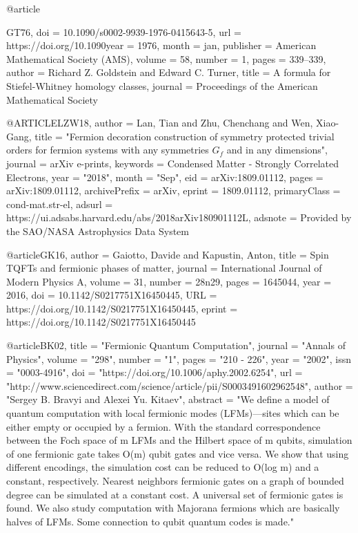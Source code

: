 \documentclass[12pt]{article}
\begin{document}
@article{GT76,
	doi = {10.1090/s0002-9939-1976-0415643-5},
	url = {https://doi.org/10.1090year = 1976,
	month = {jan},
	publisher = {American Mathematical Society ({AMS})},
	volume = {58},
	number = {1},
	pages = {339--339},
	author = {Richard Z. Goldstein and Edward C. Turner},
	title = {A formula for Stiefel-Whitney homology classes},
	journal = {Proceedings of the American Mathematical Society}
}

@ARTICLE{LZW18,
       author = {{Lan}, Tian and {Zhu}, Chenchang and {Wen}, Xiao-Gang},
        title = "{Fermion decoration construction of symmetry protected trivial orders for fermion systems with any symmetries $G_f$ and in any dimensions}",
      journal = {arXiv e-prints},
     keywords = {Condensed Matter - Strongly Correlated Electrons},
         year = "2018",
        month = "Sep",
          eid = {arXiv:1809.01112},
        pages = {arXiv:1809.01112},
archivePrefix = {arXiv},
       eprint = {1809.01112},
 primaryClass = {cond-mat.str-el},
       adsurl = {https://ui.adsabs.harvard.edu/abs/2018arXiv180901112L},
      adsnote = {Provided by the SAO/NASA Astrophysics Data System}
}


@article{GK16,
author = {Gaiotto, Davide and Kapustin, Anton},
title = {Spin TQFTs and fermionic phases of matter},
journal = {International Journal of Modern Physics A},
volume = {31},
number = {28n29},
pages = {1645044},
year = {2016},
doi = {10.1142/S0217751X16450445},
URL = { https://doi.org/10.1142/S0217751X16450445},
eprint = { https://doi.org/10.1142/S0217751X16450445}
}


@article{BK02,
title = "Fermionic Quantum Computation",
journal = "Annals of Physics",
volume = "298",
number = "1",
pages = "210 - 226",
year = "2002",
issn = "0003-4916",
doi = "https://doi.org/10.1006/aphy.2002.6254",
url = "http://www.sciencedirect.com/science/article/pii/S0003491602962548",
author = "Sergey B. Bravyi and Alexei Yu. Kitaev",
abstract = "We define a model of quantum computation with local fermionic modes (LFMs)—sites which can be either empty or occupied by a fermion. With the standard correspondence between the Foch space of m LFMs and the Hilbert space of m qubits, simulation of one fermionic gate takes O(m) qubit gates and vice versa. We show that using different encodings, the simulation cost can be reduced to O(log m) and a constant, respectively. Nearest neighbors fermionic gates on a graph of bounded degree can be simulated at a constant cost. A universal set of fermionic gates is found. We also study computation with Majorana fermions which are basically halves of LFMs. Some connection to qubit quantum codes is made."
}

}
\end{document}

